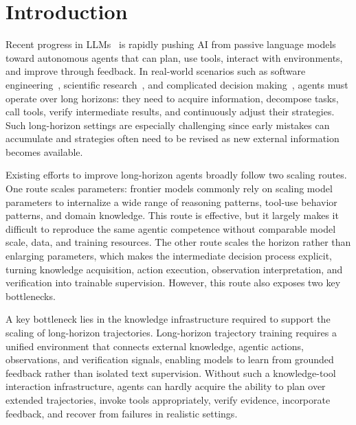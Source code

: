 \section{Introduction}
\label{sec:introd}

Recent progress in LLMs~\citep{kimi2.6, GPT5.5, claude-4.6, gemini-3-pro, deepseekai2026deepseekv4, Qwen3.5} is rapidly pushing AI from passive language models toward autonomous agents that can plan, use tools, interact with environments, and improve through feedback. In real-world scenarios such as software engineering~\citep{mlebench}, scientific research~\citep{frontierscience, phan2025humanity}, and complicated decision making~\citep{browsecomp}, agents must operate over long horizons: they need to acquire information, decompose tasks, call tools, verify intermediate results, and continuously adjust their strategies. Such long-horizon settings are especially challenging since early mistakes can accumulate and strategies often need to be revised as new external information becomes available.

Existing efforts to improve long-horizon agents \cite{zeng2026glm,du2026towards,GLM5.2,team2026kimi,sun2025scaling,copet2025cwm} broadly follow two scaling routes. One route \cite{GLM5.2,team2026kimi,claude-4.6} scales parameters: frontier models commonly rely on scaling model parameters to internalize a wide range of reasoning patterns, tool-use behavior patterns, and domain knowledge. This route is effective, but it largely makes it difficult to reproduce the same agentic competence without comparable model scale, data, and training resources. The other route scales the horizon rather than enlarging parameters, which makes the intermediate decision process explicit, turning knowledge acquisition, action execution, observation interpretation, and verification into trainable supervision. However, this route also exposes two key bottlenecks.

A key bottleneck lies in the knowledge infrastructure required to support the scaling of long-horizon trajectories. Long-horizon trajectory training requires a unified environment that connects external knowledge, agentic actions, observations, and verification signals, enabling models to learn from grounded feedback rather than isolated text supervision. Without such a knowledge-tool interaction infrastructure, agents can hardly acquire the ability to plan over extended trajectories, invoke tools appropriately, verify evidence, incorporate feedback, and recover from failures in realistic settings.


